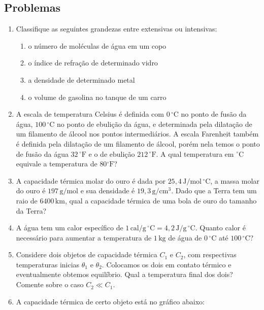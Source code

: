 \documentclass[a4paper, 12pt]{article}
\theoremstyle{definition}
\theoremstyle{definition}
\begin{document}
\subsection{Problemas}
\begin{enumerate}
    \item Classifique as seguintes grandezas entre extensivas ou intensivas:
    \begin{enumerate}
        \item o número de moléculas de água em um copo
        \item o índice de refração de determinado vidro
        \item a densidade de determinado metal
        \item o volume de gasolina no tanque de um carro
    \end{enumerate}
    \item A escala de temperatura Celsius é definida com $0\,\mathrm{^\circ C}$ no ponto de fusão da água,
    $100\,\mathrm{^\circ C}$ no ponto de ebulição da água, e determinada pela dilatação de um filamento 
    de álcool nos pontos intermediários. A escala Farenheit também é definida pela dilatação de um filamento
    de álcool, porém nela temos o ponto de fusão da água $32\,\mathrm{^\circ F}$ e o de ebulição 
    $212\,\mathrm{^\circ F}$. A qual temperatura em $\mathrm{^\circ C}$ equivale a temperatura de 
    $80\mathrm{^\circ F}$?
    \item A capacidade térmica molar do ouro é dada por $25{,}4\,\mathrm{J/mol\,^\circ C}$, a massa molar do
    ouro é $197\,\mathrm{g/mol}$ e sua densidade é $19{,}3\,\mathrm{g/cm^3}$. Dado que a Terra tem um raio de
    $6400\,\mathrm {km}$, qual a capacidade térmica de uma bola de ouro do tamanho da Terra?
    \item A água tem um calor específico de $1\,\mathrm{cal/g\,^\circ C}=4{,}2\,\mathrm{J/g\,^\circ C}$.
    Quanto calor é necessário para aumentar a temperatura de $1\,\mathrm{kg}$ de água de $0\,\mathrm{^\circ C}$
    até $100\,\mathrm{^\circ C}$?
    \item Considere dois objetos de capacidade térmica $C_1$ e $C_2$, com respectivas temperaturas inicias
    $\theta_1$ e $\theta_2$. Colocamos os dois em contato térmico e eventualmente obtemos equilíbrio. Qual
    a temperatura final dos dois? Comente sobre o caso $C_2\ll C_1$.
    \item A capacidade térmica de certo objeto está no gráfico abaixo:
    \begin{figure}[h]
        \centering
    \end{figure}


\end{enumerate}
\end{document}
